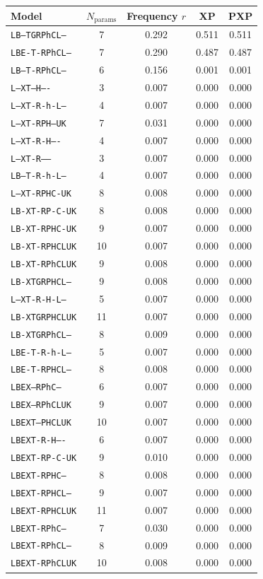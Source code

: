 \begin{tabular}{lcccc}
\toprule
Model & $N_{\text{params}}$ & Frequency $r$ & XP & PXP \\
\midrule
\texttt{LB--TGRPhCL--} & 7 & 0.292 & 0.511 & 0.511 \\
\texttt{LBE-T-RPhCL--} & 7 & 0.290 & 0.487 & 0.487 \\
\texttt{LB--T-RPhCL--} & 6 & 0.156 & 0.001 & 0.001 \\
\texttt{L--XT---H----} & 3 & 0.007 & 0.000 & 0.000 \\
\texttt{L--XT-R-h-L--} & 4 & 0.007 & 0.000 & 0.000 \\
\texttt{L--XT-RPH--UK} & 7 & 0.031 & 0.000 & 0.000 \\
\texttt{L--XT-R-H----} & 4 & 0.007 & 0.000 & 0.000 \\
\texttt{L--XT-R------} & 3 & 0.007 & 0.000 & 0.000 \\
\texttt{LB--T-R-h-L--} & 4 & 0.007 & 0.000 & 0.000 \\
\texttt{L--XT-RPHC-UK} & 8 & 0.008 & 0.000 & 0.000 \\
\texttt{LB-XT-RP-C-UK} & 8 & 0.008 & 0.000 & 0.000 \\
\texttt{LB-XT-RPHC-UK} & 9 & 0.007 & 0.000 & 0.000 \\
\texttt{LB-XT-RPHCLUK} & 10 & 0.007 & 0.000 & 0.000 \\
\texttt{LB-XT-RPhCLUK} & 9 & 0.008 & 0.000 & 0.000 \\
\texttt{LB-XTGRPHCL--} & 9 & 0.008 & 0.000 & 0.000 \\
\texttt{L--XT-R-H-L--} & 5 & 0.007 & 0.000 & 0.000 \\
\texttt{LB-XTGRPHCLUK} & 11 & 0.007 & 0.000 & 0.000 \\
\texttt{LB-XTGRPhCL--} & 8 & 0.009 & 0.000 & 0.000 \\
\texttt{LBE-T-R-h-L--} & 5 & 0.007 & 0.000 & 0.000 \\
\texttt{LBE-T-RPHCL--} & 8 & 0.008 & 0.000 & 0.000 \\
\texttt{LBEX--RPhC---} & 6 & 0.007 & 0.000 & 0.000 \\
\texttt{LBEX--RPhCLUK} & 9 & 0.007 & 0.000 & 0.000 \\
\texttt{LBEXT--PHCLUK} & 10 & 0.007 & 0.000 & 0.000 \\
\texttt{LBEXT-R-H----} & 6 & 0.007 & 0.000 & 0.000 \\
\texttt{LBEXT-RP-C-UK} & 9 & 0.010 & 0.000 & 0.000 \\
\texttt{LBEXT-RPHC---} & 8 & 0.008 & 0.000 & 0.000 \\
\texttt{LBEXT-RPHCL--} & 9 & 0.007 & 0.000 & 0.000 \\
\texttt{LBEXT-RPHCLUK} & 11 & 0.007 & 0.000 & 0.000 \\
\texttt{LBEXT-RPhC---} & 7 & 0.030 & 0.000 & 0.000 \\
\texttt{LBEXT-RPhCL--} & 8 & 0.009 & 0.000 & 0.000 \\
\texttt{LBEXT-RPhCLUK} & 10 & 0.008 & 0.000 & 0.000 \\
\bottomrule
\end{tabular}
